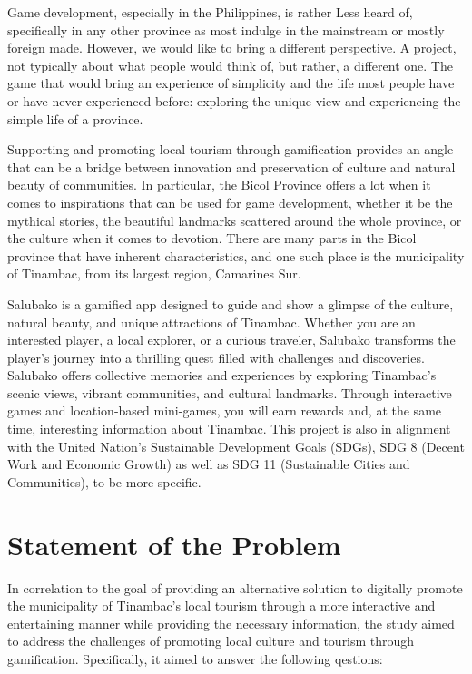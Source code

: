 \documentclass[11pt]{research}
\begin{document}
Game development, especially in the Philippines, is rather Less heard of, specifically in any other province as most indulge in the mainstream or mostly foreign made. However, we would like to bring a different perspective. A project, not typically about what people would think of, but rather, a different one. The game that would bring an experience of simplicity and the life most people have or have never experienced before: exploring the unique view and experiencing the simple life of a province.

Supporting and promoting local tourism through gamification provides an angle that can be a bridge between innovation and preservation of culture and natural beauty of communities. In particular, the Bicol Province offers a lot when it comes to inspirations that can be used for game development, whether it be the mythical stories, the beautiful landmarks scattered around the whole province, or the culture when it comes to devotion. There are many parts in the Bicol province that have inherent characteristics, and one such place is the municipality of Tinambac, from its largest region, Camarines Sur.

Salubako is a gamified app designed to guide and show a glimpse of the culture, natural beauty, and unique attractions of Tinambac. Whether you are an interested player, a local explorer, or a curious traveler, Salubako transforms the player’s journey into a thrilling quest filled with challenges and discoveries. Salubako offers collective memories and experiences by exploring Tinambac's scenic views, vibrant communities, and cultural landmarks. Through interactive games and location-based mini-games, you will earn rewards and, at the same time, interesting information about Tinambac. This project is also in alignment with the United Nation’s Sustainable Development Goals (SDGs), SDG 8 (Decent Work and Economic Growth) as well as SDG 11 (Sustainable Cities and Communities), to be more specific.


\section{Statement of the Problem}

In correlation to the goal of providing an alternative solution to digitally promote the municipality of Tinambac’s local tourism through a more interactive and entertaining manner while providing the necessary information, the study aimed to address the challenges of promoting local culture and tourism through gamification. Specifically, it aimed to answer the following qestions: 
\end{document}
